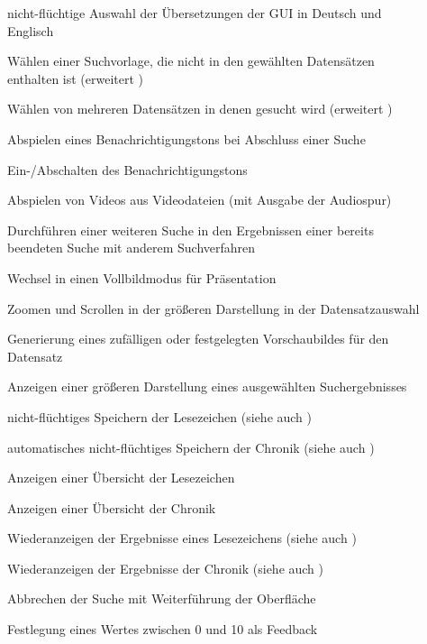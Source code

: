 \begin{description}
	\item[] nicht-flüchtige Auswahl der Übersetzungen der \gls{GUI} in Deutsch und Englisch
	\newline
	\item[] Wählen einer Suchvorlage, die nicht in den gewählten Datensätzen enthalten ist (erweitert )
	\item[] Wählen von mehreren Datensätzen in denen gesucht wird (erweitert )
	\newline
	\item[] Abspielen eines Benachrichtigungstons bei Abschluss einer Suche
	\item[] Ein-/Abschalten des Benachrichtigungstons
	\item[] Abspielen von Videos aus Videodateien (mit Ausgabe der Audiospur)
	\item[] Durchführen einer weiteren Suche in den Ergebnissen einer bereits beendeten Suche mit anderem Suchverfahren 
	\newline
	\item[] Wechsel in einen Vollbildmodus für Präsentation
	
	\item[] Zoomen und Scrollen in der größeren Darstellung in der Datensatzauswahl
	\item[] Generierung eines zufälligen oder festgelegten Vorschaubildes für den Datensatz
	\item[] Anzeigen einer größeren Darstellung eines ausgewählten Suchergebnisses
	
	\item[] nicht-flüchtiges Speichern der Lesezeichen (siehe auch )
	\item[] automatisches nicht-flüchtiges Speichern der Chronik (siehe auch )
	\item[] Anzeigen einer Übersicht der Lesezeichen
	\item[] Anzeigen einer Übersicht der Chronik
	\item[] Wiederanzeigen der Ergebnisse eines Lesezeichens (siehe auch )
	\item[] Wiederanzeigen der Ergebnisse der Chronik (siehe auch )
	
	\item[] Abbrechen der Suche mit Weiterführung der Oberfläche
	\item[] Festlegung eines Wertes zwischen 0 und 10 als Feedback
\end{description}
\pagebreak
